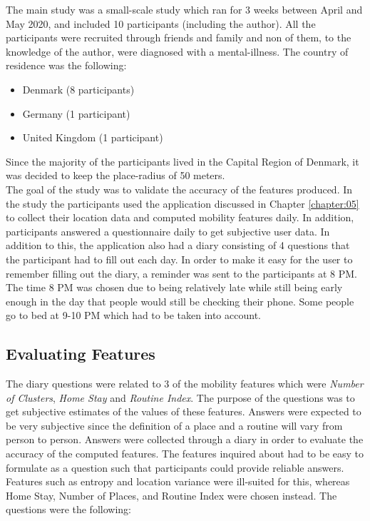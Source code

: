 The main study was a small-scale study which ran for 3 weeks between April and May 2020, and included 10 participants (including the author). All the participants were recruited through friends and family and non of them, to the knowledge of the author, were diagnosed with a mental-illness. The country of residence was the following:

\begin{itemize}
    \item Denmark (8 participants)
    \item Germany (1 participant)
    \item United Kingdom (1 participant)
\end{itemize}

Since the majority of the participants lived in the Capital Region of Denmark, it was decided to keep the place-radius of 50 meters.\\

The goal of the study was to validate the accuracy of the features produced. In the study the participants used the application discussed in Chapter \ref{chapter:05} to collect their location data and computed mobility features daily. In addition, participants answered a questionnaire daily to get subjective user data. In addition to this, the application also had a diary consisting of 4 questions that the participant had to fill out each day. In order to make it easy for the user to remember filling out the diary, a reminder was sent to the participants at 8 PM. The time 8 PM was chosen due to being relatively late while still being early enough in the day that people would still be checking their phone. Some people go to bed at 9-10 PM which had to be taken into account.\\


\subsection{Evaluating Features}
The diary questions were related to 3 of the mobility features which were \textit{Number of Clusters}, \textit{Home Stay} and \textit{Routine Index}. The purpose of the questions was to get subjective estimates of the values of these features. Answers were expected to be very subjective since the definition of a place and a routine will vary from person to person. Answers were collected through a diary in order to evaluate the accuracy of the computed features. The features inquired about had to be easy to formulate as a question such that participants could provide reliable answers. Features such as entropy and location variance were ill-suited for this, whereas Home Stay, Number of Places, and Routine Index were chosen instead. The questions were the following:

